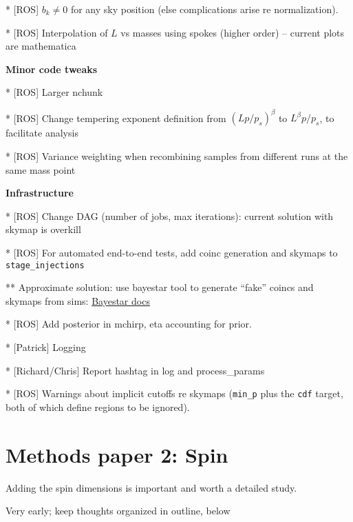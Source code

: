 *  [ROS]  $b_k \ne 0$ for any sky position (else complications arise re normalization).

* [ROS] Interpolation of $L$ vs masses using spokes (higher order) -- current plots are mathematica

\noindent \textbf{Minor code tweaks}

* [ROS] Larger nchunk

* [ROS] Change tempering exponent definition from $(Lp/p_s)^\beta$ to $L^\beta p/p_s$, to facilitate analysis

* [ROS] Variance weighting when recombining samples from different runs at the same mass point


\noindent \textbf{Infrastructure}

* [ROS] Change DAG (number of jobs, max iterations): current solution with skymap is overkill


* [ROS] For automated end-to-end tests, add \gstlal{} coinc generation and \BS{} skymaps to \texttt{stage\_injections}

** Approximate solution: use bayestar tool to generate ``fake'' coincs and skymaps from sims:
\href{https://www.lsc-group.phys.uwm.edu/ligovirgo/cbcnote/ParameterEstimationModelSelection/BAYESTARHowTo}{Bayestar docs}

* [ROS] Add posterior in mchirp, eta accounting for prior.

* [Patrick] Logging

* [Richard/Chris] Report hashtag in log and process\_params

* [ROS] Warnings about implicit cutoffs re skymaps (\texttt{min\_p} plus the \texttt{cdf} target, both of which define
regions to be ignored).


\section{Methods  paper 2: Spin}

Adding the spin dimensions is important and worth a detailed study.


Very early; keep thoughts organized in outline, below


